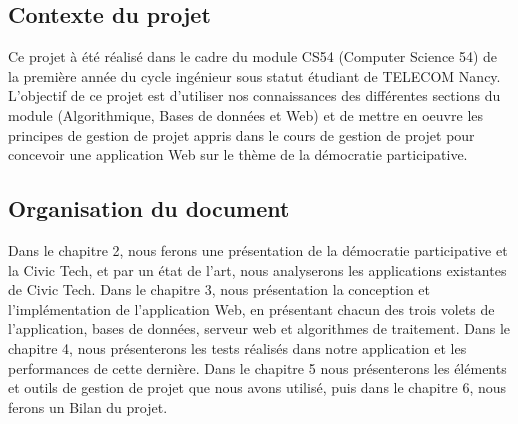 \vskip 0.60cm
\subsection{Contexte du projet}
\vskip 0.25cm
\noindent
Ce projet à été réalisé dans le cadre du module CS54 (Computer Science 54) de la première année du cycle ingénieur sous statut étudiant de TELECOM Nancy.
\vskip 0.25cm
\noindent
L'objectif de ce projet est d'utiliser nos connaissances des différentes sections du module (Algorithmique, Bases de données et Web) et de mettre en oeuvre les principes de gestion de projet appris dans le cours de gestion de projet pour concevoir une application Web sur le thème de la démocratie participative.
\vskip 0.25cm
\subsection{Organisation du document}
\vskip 0.25cm
\noindent
Dans le chapitre 2, nous ferons une présentation de la démocratie participative et la Civic Tech, et par un état de l'art, nous analyserons les applications existantes de Civic Tech.
\vskip 0.25cm
\noindent
Dans le chapitre 3, nous présentation la conception et l'implémentation de l'application Web, en présentant chacun des trois volets de l'application, bases de données, serveur web et algorithmes de traitement. 
\vskip 0.25cm
\noindent
Dans le chapitre 4, nous présenterons les tests réalisés dans notre application et les performances de cette dernière.
\vskip 0.25cm
\noindent
Dans le chapitre 5 nous présenterons les éléments et outils de gestion de projet que nous avons utilisé, puis dans le chapitre 6, nous ferons un Bilan du projet.
\vskip 0.25cm
